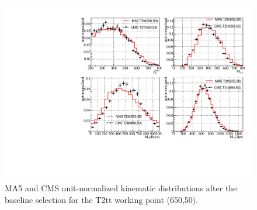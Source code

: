    \begin{figure}
  \centering
    \includegraphics[width=\textwidth]{figures/Appendices/Ma5ValidationSUS13012/T2tt-650-50.pdf}
  \caption{MA5 and CMS unit-normalized kinematic distributions after the baseline
    selection for the T2tt working point (650,50).}
\end{figure}

